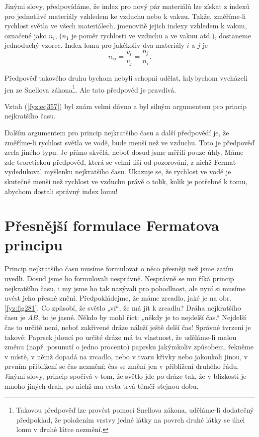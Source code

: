     Jinými slovy, předpovídáme, že index pro nový pár materiálů lze získat z indexů pro jednotlivé 
    materiály vzhledem ke vzduchu nebo k vakuu. Takže, změříme-li rychlost světla ve všech 
    materiálech, jmenovitě jejich indexy vzhledem k vakuu, označené jako \(n_i\), (\(n_1\) je poměr 
    rychlosti ve vzduchu a ve vakuu atd.), dostaneme jednoduchý vzorec. Index lomu pro jakékoliv 
    dva materiály \(i\) a \(j\) je
    \begin{equation}\label{fyz:eq358}
      n_{ij} = \frac{v_i}{v_j} = \frac{n_j}{n_i}.
    \end{equation}
    
    Předpověď takového druhu bychom nebyli schopni udělat, kdybychom vycházeli jen ze Snellova 
    zákona\footnote{Takovou předpověď lze provést pomocí Snellova zákona, uděláme-li dodatečný 
    předpoklad, že položením vrstvy jedné látky na povrch druhé látky se úhel lomu v druhé látce 
    nezmění.}. Ale tato předpověď je pravdivá.
    
    Vztah (\ref{fyz:eq357}) byl znám velmi dávno a byl silným argumentem pro princip nejkratšího 
    času.
    
    Dalším argumentem pro princip nejkratšího času a další předpovědí je, že změříme-li rychlost 
    světla ve vodě, bude menší než ve vzduchu. Toto je předpověď zcela jiného typu. Je přímo 
    skvělá, neboť dosud jsme měřili pouze úhly. Máme zde teoretickou předpověď, která se velmi liší 
    od pozorování, z nichž Fermat vydedukoval myšlenku nejkratšího času. Ukazuje se, že rychlost ve 
    vodě je skutečně menší než rychlost ve vzduchu právě o tolik, kolik je potřebné k tomu, abychom 
    dostali správný index lomu!
    
  \section{Přesnější formulace Fermatova principu}\label{fyz:IchapXXVIsecV}
    Princip nejkratšího času musíme formulovat o něco přesněji než jsme zatím uvedli. Dosud jsme ho 
    formulovali nesprávně. Nesprávně se mu říká princip nejkratšího času, i my jsme ho tak nazývali 
    pro pohodlnost, ale nyní si musíme uvést jeho přesné znění. Předpokládejme, že máme zrcadlo, 
    jaké je na obr. \ref{fyz:fig281}. Co způsobí, že světlo „ví“, že má jít k zrcadlu? Dráha 
    nejkratšího času je \(AB\), to je jasné. Někdo by mohl říct: „někdy je to nejdelší čas.“ 
    Nejdelší čas to určitě není, neboť zakřivené dráze náleží ještě delší čas! Správné tvrzení je 
    takové: Paprsek jdoucí po určité dráze má tu vlastnost, že uděláme-li malou změnu (např. 
    posunutí o jedno procento) paprsku jakýmkoliv způsobem, řekněme v místě, v němž dopadá na 
    zrcadlo, nebo v tvaru křivky nebo jakoukoli jinou, v prvním přiblížení se čas nezmění; čas se 
    změní jen v přiblížení druhého řádu. Jinými slovy, princip spočívá v tom, že světlo jde po 
    dráze tak, že v blízkosti je mnoho jiných drah, po nichž mu cesta trvá téměř stejnou dobu.
    
